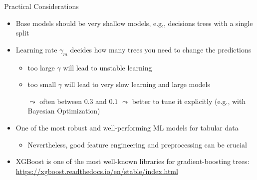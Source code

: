 \documentclass[aspectratio=169]{../latex_main/tntbeamer}  %
\begin{document}
	\begin{frame}[c]{Practical Considerations}

    \begin{itemize}
        \item Base models should be very shallow models, e.g,, decisions trees with a single split
        \smallskip
        \item Learning rate $\gamma_m$ decides how many trees you need to change the predictions
        \begin{itemize}
            \item too large $\gamma$ will lead to unstable learning
            \item too small $\gamma$ will lead to very slow learning and large models
            \item[$\leadsto$] often between $0.3$ and $0.1$ $\leadsto$ better to tune it explicitly (e.g., with Bayesian Optimization)
        \end{itemize}
        \smallskip
        \item One of the most robust and well-performing ML models for tabular data
        \begin{itemize}
            \item Nevertheless, good feature engineering and preprocessing can be crucial
        \end{itemize}
        \smallskip
        \item XGBoost is one of the most well-known libraries for gradient-boosting trees:\\ \url{https://xgboost.readthedocs.io/en/stable/index.html}
    \end{itemize}

	\end{frame}
	
	
\end{document}
